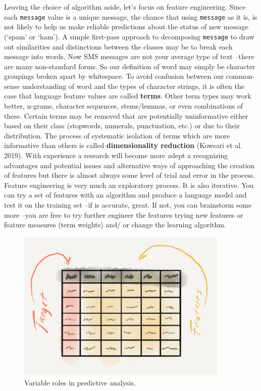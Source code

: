\documentclass[
  letterpaper,
]{latex/krantz}
\begin{document}
Leaving the choice of algorithm aside, let's focus on feature
engineering. Since each \texttt{message} value is a unique message, the
chance that using \texttt{message} as it is, is not likely to help us
make reliable predictions about the status of new message (`spam' or
`ham'). A simple first-pass approach to decomposing \texttt{message} to
draw out similarities and distinctions between the classes may be to
break each message into words. Now SMS messages are not your average
type of text --there are many non-standard forms. So our definition of
word may simply be character groupings broken apart by whitespace. To
avoid confusion between our common-sense understanding of word and the
types of character strings, it is often the case that language feature
values are called \textbf{terms}. Other term types may work better,
n-grams, character sequences, stems/lemmas, or even combinations of
these. Certain terms may be removed that are potentially uninformative
either based on their class (stopwords, numerals, punctuation, etc.) or
due to their distribution. The process of systematic isolation of terms
which are more informative than others is called \textbf{dimensionality
reduction} (Kowsari et al. 2019). With experience a research will become
more adept a recognizing advantages and potential issues and alternative
ways of approaching the creation of features but there is almost always
some level of trial and error in the process. Feature engineering is
very much an exploratory process. It is also iterative. You can try a
set of features with an algorithm and produce a language model and test
it on the training set --if is accurate, great. If not, you can
brainstorm some more --you are free to try further engineer the features
trying new features or feature measures (term weights) and/ or change
the learning algorithm.

\begin{figure}[h]

{\centering \includegraphics[width=0.9\textwidth,height=\textheight]{./figures/approaching-analysis/predictive-variables.png}

}

\caption{\label{fig-aa-predictive-variables}Variable roles in predictive
analysis.}

\end{figure}
\end{document}
